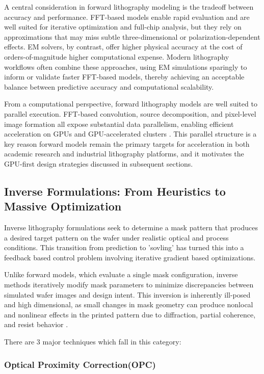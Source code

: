 \documentclass[pdflatex,sn-mathphys-num]{sn-jnl}%
\theoremstyle{thmstyleone}%
\theoremstyle{thmstyletwo}%
\theoremstyle{thmstylethree}%
\begin{document}
A central consideration in forward lithography modeling is the tradeoff between accuracy and performance. FFT-based models enable rapid evaluation and are well suited for iterative optimization and full-chip analysis, but they rely on approximations that may miss subtle three-dimensional or polarization-dependent effects. EM solvers, by contrast, offer higher physical accuracy at the cost of orders-of-magnitude higher computational expense. Modern lithography workflows often combine these approaches, using EM simulations sparingly to inform or validate faster FFT-based models, thereby achieving an acceptable balance between predictive accuracy and computational scalability.

From a computational perspective, forward lithography models are well suited to parallel execution. FFT-based convolution, source decomposition, and pixel-level image formation all expose substantial data parallelism, enabling efficient acceleration on GPUs and GPU-accelerated clusters \cite{Govindaraju08,Zheng2023}. This parallel structure is a key reason forward models remain the primary targets for acceleration in both academic research and industrial lithography platforms, and it motivates the GPU-first design strategies discussed in subsequent sections.

\subsection{Inverse Formulations: From Heuristics to Massive Optimization}
Inverse lithography formulations seek to determine a mask pattern that produces a desired target pattern on the wafer under realistic optical and process conditions. This transition from prediction to 'sovling' has turned this into a feedback based control problem involving iterative gradient based optimizations. 

Unlike forward models, which evaluate a single mask configuration, inverse methods iteratively modify mask parameters to minimize discrepancies between simulated wafer images and design intent. This inversion is inherently ill-posed and high dimensional, as small changes in mask geometry can produce nonlocal and nonlinear effects in the printed pattern due to diffraction, partial coherence, and resist behavior \cite{Wong2001ResolutionET,cecil2022advances}.

There are 3 major techniques which fall in this category: 

\subsubsection{Optical Proximity Correction(OPC)}
\end{document}
